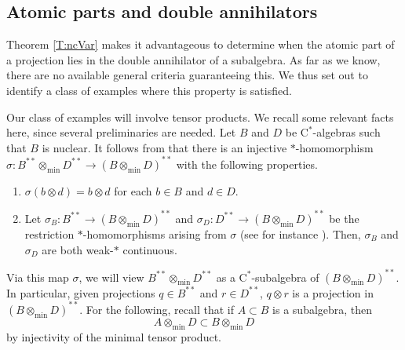 \documentclass[10pt]{amsart}
\newcommand{\rC}{\mathrm{C}}
\theoremstyle{definition}
\begin{document}
 
 
 \subsection{Atomic parts and double annihilators}
Theorem \ref{T:ncVar} makes it advantageous to determine when the atomic part of a projection lies in the double annihilator of a subalgebra. As far as we know, there are no available general criteria guaranteeing this. We thus set out to identify a class of examples where this property is satisfied. 


 Our class of examples will involve tensor products. We recall some relevant facts here, since several preliminaries are needed. 
Let $B$ and $D$ be $\rC^*$-algebras such that $B$ is nuclear. It follows from \cite[Theorem 3.1]{AB1980} that there is an injective $*$-homomorphism $\sigma: B^{**}\otimes_{\min} D^{**}\to (B\otimes_{\min} D)^{**}$ with the following properties.
\begin{enumerate}[{\rm (i)}]
\item $\sigma(b\otimes d)=b\otimes d$ for each $b\in B$ and $d\in D$.
\item Let $\sigma_B:B^{**}\to (B\otimes_{\min} D)^{**}$ and $\sigma_D:D^{**}\to (B\otimes_{\min} D)^{**}$ be the restriction $*$-homomorphisms arising from $\sigma$ (see for instance \cite[Theorem 3.2.6]{BO2008}). Then, $\sigma_B$ and $\sigma_D$ are both weak-$*$ continuous.
\end{enumerate}
Via this map $\sigma$, we will view $B^{**}\otimes_{\min} D^{**}$ as a $\rC^*$-subalgebra of $(B\otimes_{\min} D)^{**}$. In particular, given projections $q\in B^{**}$ and $r\in D^{**}$, $q\otimes r$ is a projection in $(B\otimes_{\min} D)^{**}$.  For the following, recall that if $A\subset B$ is a subalgebra, then $$A\otimes_{\min}D\subset B\otimes_{\min}D$$ by injectivity of the minimal tensor product. 
\end{document}
